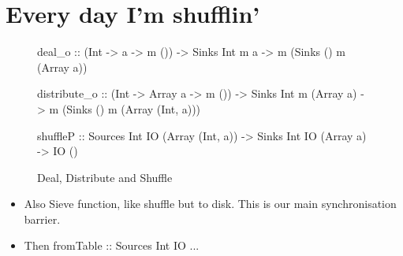 \section{Every day I'm shufflin'}


\begin{figure}
\begin{code}
deal_o       :: (Int -> a -> m ()) 
             -> Sinks Int m a         -> m (Sinks () m (Array a))

distribute_o :: (Int -> Array a -> m ())
             -> Sinks Int m (Array a) -> m (Sinks () m (Array (Int, a)))

shuffleP     :: Sources Int IO (Array (Int, a))
             -> Sinks   Int IO (Array a)
             -> IO ()
\end{code}
\caption{Deal, Distribute and Shuffle}
\end{figure}



\begin{itemize}
\item Also Sieve function, like shuffle but to disk.
      This is our main synchronisation barrier.
\item Then fromTable :: Sources Int IO ...
\end{itemize}
